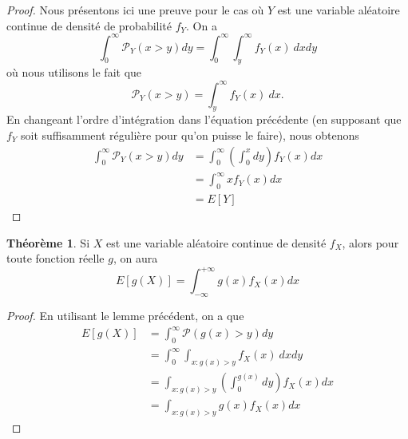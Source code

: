 \documentclass[a4paper,12pt]{report}
\theoremstyle{definition}
\renewcommand{\(}{\left(}
\renewcommand{\)}{\right)}
\renewcommand{\P}{\mathcal{P}}
\newtheorem{thm}{Théorème}[section]
\begin{document}
            \begin{proof}
                    Nous présentons ici une preuve pour le cas où $Y$ est une variable aléatoire continue de densité de probabilité $f_Y$. On a
                    \begin{equation*}
                        \displaystyle{\int_0^{\infty} \P_Y(x>y)dy} = \displaystyle{\int_0^{\infty} \int_y^{\infty} f_Y(x)~dxdy}
                    \end{equation*}
                    où nous utilisons le fait que 
                    \begin{equation*}
                        \P_Y(x >y) = \int_y^{\infty} f_Y(x)~dx.
                    \end{equation*}
                    En changeant l'ordre d'intégration dans l'équation précédente (en supposant que $f_Y$ soit suffisamment régulière pour qu'on puisse le faire), nous obtenons
                    \begin{align*}
                        \displaystyle{\int_0^{\infty} \P_Y(x >y)dy} &= \displaystyle{\int_0^{\infty}\left(\int_0^xdy\right)f_Y(x)dx }\\
                        &= \displaystyle{\int_0^{\infty} xf_Y(x)dx}\\
                        &= E[Y]
                    \end{align*}
                \end{proof}
            
            \begin{leftbar}
            \begin{thm}
                Si $X$ est une variable aléatoire continue de densité $f_X$, alors pour toute fonction réelle $g$, on aura 
                \begin{equation*}
                    E[g(X)] = \displaystyle{\int_{-\infty}^{+\infty}g(x)f_X(x)dx}
                \end{equation*}
            \end{thm}
            \end{leftbar}
            
            \begin{proof}
                En utilisant le lemme précédent, on a que
                \begin{align*}
                    E[g(X)] &= \displaystyle{\int_{0}^{\infty} \P(g(x) > y) dy}\\
                    &= \displaystyle{\int_{0}^{\infty} \int_{x :g(x) > y} f_X(x)~ dxdy}\\
                    &= \displaystyle{\int_{x :g(x) > y}\left(\int_{0}^{g(x)}dy\right)f_X(x)dx}\\
                    &= \displaystyle{\int_{x : g(x) > y} g(x) f_X(x) dx}
                \end{align*}
            \end{proof}
            
\end{document}
